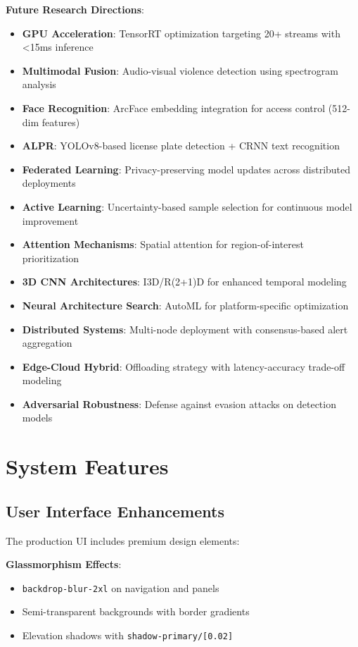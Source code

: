 \documentclass[conference]{IEEEtran}
\begin{document}
\textbf{Future Research Directions}:
\begin{itemize}
    \item \textbf{GPU Acceleration}: TensorRT optimization targeting 20+ streams with <15ms inference
    \item \textbf{Multimodal Fusion}: Audio-visual violence detection using spectrogram analysis
    \item \textbf{Face Recognition}: ArcFace embedding integration for access control (512-dim features)
    \item \textbf{ALPR}: YOLOv8-based license plate detection + CRNN text recognition
    \item \textbf{Federated Learning}: Privacy-preserving model updates across distributed deployments
    \item \textbf{Active Learning}: Uncertainty-based sample selection for continuous model improvement
    \item \textbf{Attention Mechanisms}: Spatial attention for region-of-interest prioritization
    \item \textbf{3D CNN Architectures}: I3D/R(2+1)D for enhanced temporal modeling
    \item \textbf{Neural Architecture Search}: AutoML for platform-specific optimization
    \item \textbf{Distributed Systems}: Multi-node deployment with consensus-based alert aggregation
    \item \textbf{Edge-Cloud Hybrid}: Offloading strategy with latency-accuracy trade-off modeling
    \item \textbf{Adversarial Robustness}: Defense against evasion attacks on detection models
\end{itemize}

\section{System Features}

\subsection{User Interface Enhancements}
The production UI includes premium design elements:

\textbf{Glassmorphism Effects}:
\begin{itemize}
    \item \texttt{backdrop-blur-2xl} on navigation and panels
    \item Semi-transparent backgrounds with border gradients
    \item Elevation shadows with \texttt{shadow-primary/[0.02]}
\end{itemize}
\end{document}
